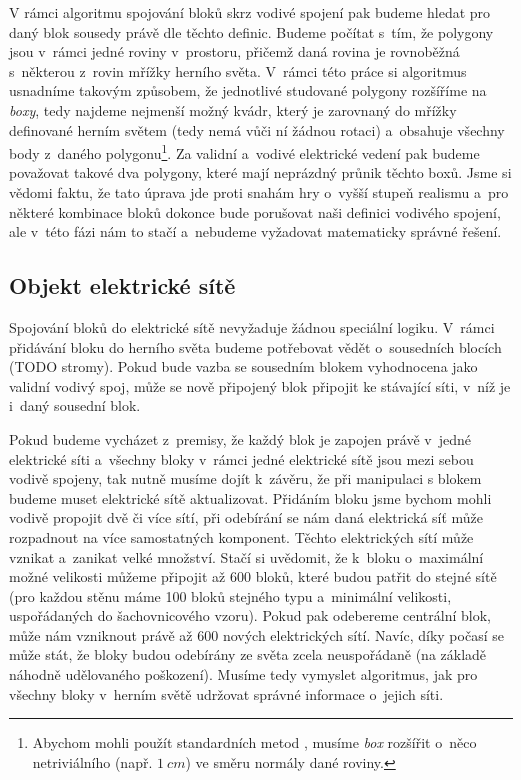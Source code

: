 V rámci algoritmu spojování bloků skrz vodivé spojení pak budeme hledat pro daný blok sousedy právě dle těchto definic. Budeme počítat s~tím, že polygony jsou v~rámci jedné roviny v~prostoru, přičemž daná rovina je rovnoběžná s~některou z~rovin mřížky herního světa. V~rámci této práce si algoritmus usnadníme takovým způsobem, že jednotlivé studované polygony rozšíříme na \textit{boxy}, tedy najdeme nejmenší možný kvádr, který je zarovnaný do mřížky definované herním světem (tedy nemá vůči ní žádnou rotaci) a~obsahuje všechny body z~daného polygonu\footnote{Abychom mohli použít standardních metod , musíme \textit{box} rozšířit o~něco netriviálního (např. $1~cm$) ve směru normály dané roviny.}. Za validní a~vodivé elektrické vedení pak budeme považovat takové dva polygony, které mají neprázdný průnik těchto boxů. Jsme si vědomi faktu, že tato úprava jde proti snahám hry o~vyšší stupeň realismu a~pro některé kombinace bloků dokonce bude porušovat naši definici vodivého spojení, ale v~této fázi nám to stačí a~nebudeme vyžadovat matematicky správné řešení.


\subsection{Objekt elektrické sítě}

Spojování bloků do elektrické sítě nevyžaduje žádnou speciální logiku. V~rámci přidávání bloku do herního světa budeme potřebovat vědět o~sousedních blocích (TODO stromy). Pokud bude vazba se sousedním blokem vyhodnocena jako validní vodivý spoj, může se nově připojený blok připojit ke stávající síti, v~níž je i~daný sousední blok.

Pokud budeme vycházet z~premisy, že každý blok je zapojen právě v~jedné elektrické síti a~všechny bloky v~rámci jedné elektrické sítě jsou mezi sebou vodivě spojeny, tak nutně musíme dojít k~závěru, že při manipulaci s blokem budeme muset elektrické sítě aktualizovat. Přidáním bloku jsme bychom mohli vodivě propojit dvě či více sítí, při odebírání se nám daná elektrická síť může rozpadnout na více samostatných komponent. Těchto elektrických sítí může vznikat a~zanikat velké množství. Stačí si uvědomit, že k~bloku  o~maximální možné velikosti můžeme připojit až 600 bloků, které budou patřit do stejné sítě (pro každou stěnu máme 100 bloků stejného typu a~minimální velikosti, uspořádaných do šachovnicového vzoru). Pokud pak odebereme centrální blok, může nám vzniknout právě až 600 nových elektrických sítí. Navíc, díky počasí se může stát, že bloky budou odebírány ze světa zcela neuspořádaně (na základě náhodně udělovaného poškození). Musíme tedy vymyslet algoritmus, jak pro všechny bloky v~herním světě udržovat správné informace o~jejich síti.

